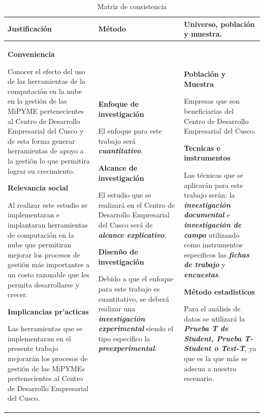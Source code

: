 \begin{table}
\centering
\caption{Matriz de consistencia}
\label{t:consistencia_cont}
\begin{tabular}{|p{7cm}|p{6cm}|p{6cm}|}
\hline
Justificación & Método & Universo, población y muestra. \\ \hline
\textbf{Conveniencia}

Conocer el efecto del uso de las herramientas de la computación en la nube en
la gestión de las MiPYME pertenecientes al Centro de Desarrollo Empresarial del Cusco y de esta forma
generar herramientas de apoyo a la gestión lo que permitira lograr su crecimiento.


\textbf{Relevancia social}

Al realizar este estudio se implementaran e implantaran
herramientas de computación en la nube que permitiran mejorar los procesos de gestión
más importantes a un costo razonable que les permita desarrollarse y crecer.

\textbf{Implicancias pr'acticas}

Las herramientas que se implementaran en el presente trabajo mejorarán los procesos
de gestión de las MiPYMEs pertenecientes al Centro de Desarrollo Empresarial del Cusco.

&
\textbf{Enfoque de investigación}

El enfoque para este trabajo será \emph{\textbf{cuantitativo}}.

\textbf{Alcance de investigación}

El estudio que se realizará en el Centro de Desarrollo Empresarial del Cusco será
de \emph{\textbf{alcance explicativo}.}

\textbf{Disenño de investigación}

Debido a que el enfoque para este trabajo es cuantitativo, se deberá realizar
una \emph{\textbf{investigación experimental}} siendo el tipo específico la
\emph{\textbf{preexperimental}}.
&
\textbf{Población y Muestra}

Empresas que son beneficiarias del Centro de Desarrollo Empresarial del Cusco.

\textbf{Tecnicas e instrumentos}

Las técnicas que se aplicarán para este trabajo serán:
la \emph{\textbf{investigación documental}} e \emph{\textbf{investigación de campo}}
utilizando como instrumentos especificos las \emph{\textbf{fichas de trabajo}} y
\emph{\textbf{encuestas}}.

\textbf{Método estadisticos}

Para el análisis de datos se utilizará la \emph{\textbf{Prueba T de Student, Prueba
T-Student o Test-T}}, ya que es la que más se adecua a nuestro escenario.

\\ \hline
\end{tabular}%
\end{table}

